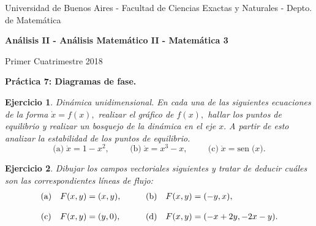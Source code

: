 \documentclass[11pt,a4paper,pdftex]{amsart}
\newtheorem{ej}{Ejercicio}%
\numberwithin{equation}{section}%
\newcommand{\bej}[1]{\begin{ej}\rm{#1}}
\newcommand{\eej}{\end{ej}\vspace{-0.2cm}}
\renewcommand{\bf}{\textbf}
\newcommand{\0}{\mathbb O}
\newcommand{\8}{\infty}
\newcommand{\sen}[1]{\mbox{sen}\;{#1}}
\begin{document}

\centerline{{\small Universidad de Buenos Aires - Facultad de Ciencias Exactas y Naturales - Depto. de Matemática}}

 \vskip 0.2cm
 \hrulefill
 \vskip 0.2cm

 \centerline{{\bf{\Large{\sc Análisis II - Análisis Matemático II - Matemática 3}}}}
 \vskip 0.2cm
 \centerline{\ttfamily Primer Cuatrimestre 2018}
 \hrulefill

 \medskip
 \centerline{\bf {Práctica 7: Diagramas de fase.}}
 \medskip

\setcounter{equation}{0}

\bej
{\emph {Din\'amica unidimensional}.} En cada una de las siguientes ecuaciones de la forma $\dot{x}=f(x),$ realizar el gráfico de $f(x),$ hallar los puntos de equilibrio y realizar un bosquejo de la din\'amica en el eje $x.$ A partir de esto analizar la estabilidad de los puntos de equilibrio.
$$
\text{(a)}\; \dot{x}=1-x^2, \hspace{1cm} \text{(b)}\; \dot{x}=x^3-x, \hspace{1cm} \text{(c)}\; \dot{x}=\sen(x).
$$
\eej

\bej Dibujar los campos vectoriales siguientes y tratar de deducir cuáles son las correspondientes
líneas de flujo:
\[%
\begin{array}
[c]{clcccl}%
\text{(a)} & F(x,y)=(x,y), &  &  & \text{(b)} & F(x,y)=(-y,x),\\
&  &  &  &  & \\
\text{(c)} & F(x,y)=(y,0), &  &  & \text{(d)} & F(x,y)=(-x+2y,-2x-y).
\end{array}
\]%
\eej

\end{document}

